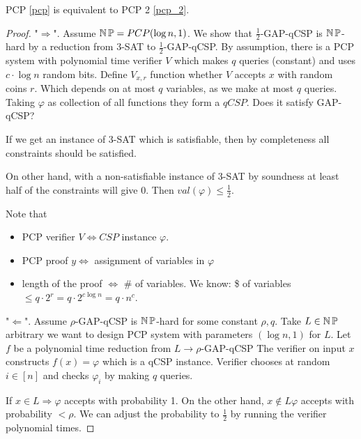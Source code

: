 \begin{theorem}
	PCP \cref{pcp} is equivalent to PCP 2 \cref{pcp_2}.
\end{theorem}
\begin{proof}
	"$\Rightarrow$". Assume $ \operatorname{\operatorname{\mathbb{N}}\mathbb{P}} = PCP (\log n, 1)$.
	We show that $\frac{1}{2}$-GAP-qCSP is $\operatorname{\operatorname{\mathbb{N}}\mathbb{P}}$-hard by a reduction from 3-SAT to $\frac{1}{2}$-GAP-qCSP.
	By assumption, there is a PCP system with polynomial time verifier $V$ which makes $q$ queries (constant) and uses $c \cdot \log n$ random bits.
	Define $V_{x, r}$ function whether $V$ accepts $x$ with random coins $r$.
	Which depends on at most $q$ variables, as we make at most $q$ queries.
	Taking $\varphi$ as collection of all functions they form a $qCSP$.
	Does it satisfy GAP-qCSP?

	If we get an instance of 3-SAT which is satisfiable, then by completeness all constraints should be satisfied.

	On other hand, with a non-satisfiable instance of 3-SAT by soundness at least half of the constraints will give 0. Then $val(\varphi) \leq \frac{1}{2}$.

	Note that
	\begin{itemize}
		\item PCP verifier $V \iff CSP$ instance $\varphi$.
		\item PCP proof $y \iff$ assignment of variables in $\varphi$
		\item length of the proof $\iff$ \# of variables.
			We know: \$ of variables $\leq q \cdot 2^r = q \cdot 2^{c \log n} = q \cdot n^c$.
	\end{itemize}

	"$\Leftarrow$". Assume $ \rho$-GAP-qCSP is $\operatorname{\operatorname{\mathbb{N}}\mathbb{P}}$-hard for some constant $\rho, q$.
	Take $L \in \operatorname{\operatorname{\mathbb{N}}\mathbb{P}}$ arbitrary we want to design PCP system with parameters $(\log n, 1)$ for $L$.
	Let $f$ be a polynomial time reduction from $L \to \rho$-GAP-qCSP
	The verifier on input $x$ constructs $f(x) = \varphi$ which is a qCSP instance.
	Verifier chooses at random $i \in [n]$ and checks $\varphi_i$ by making $q$ queries.

	If $x \in L \Rightarrow \varphi$ accepts with probability 1.
	On the other hand, $x \notin L \varphi$ accepts with probability $< \rho$.
	We can adjust the probability to $\frac{1}{2}$ by running the verifier polynomial times.
\end{proof}
